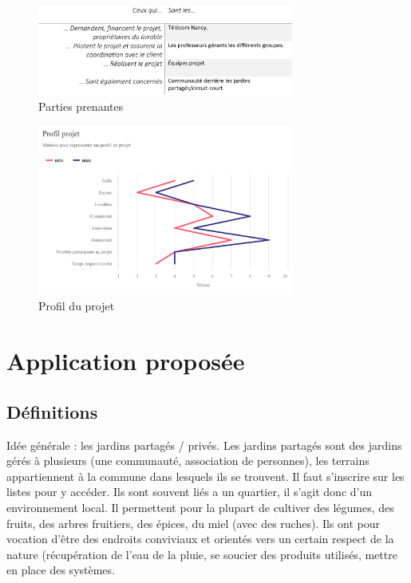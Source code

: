 \documentclass[french,a4paper]{article}
\begin{document}
\begin{figure}[h]
    \centering
    \includegraphics[width=0.75\textwidth]{img/parties_prenantes.png}
    \caption{Parties prenantes}
\end{figure}

\begin{figure}[h]
    \centering
    \includegraphics[width=0.75\textwidth]{img/profil_projet.png}
    \caption{Profil du projet}
\end{figure}

\newpage
\section{Application proposée}
\subsection{Définitions}
Idée générale : les jardins partagés / privés. Les jardins partagés sont des jardins gérés à plusieurs (une communauté, association de personnes), les terrains appartiennent à la commune dans lesquels ils se trouvent. Il faut s’inscrire sur les listes pour y accéder. Ils sont souvent liés a un quartier, il s’agit donc d’un environnement local. Il permettent pour la plupart de cultiver des légumes, des fruits, des arbres fruitiers, des épices, du miel (avec des ruches). Ils ont pour vocation d’être des endroits conviviaux et orientés vers un certain respect de la nature (récupération de l’eau de la pluie, se soucier des produits utilisés, mettre en place des systèmes. 
\end{document}
